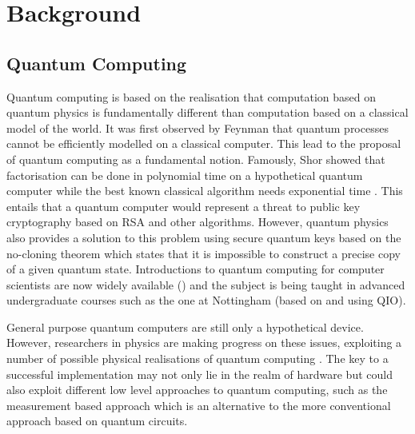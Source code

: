 \documentclass[a4paper]{article}
\begin{document}
\section{Background}

\subsection*{Quantum Computing}
Quantum computing is based on the realisation that computation based
on quantum physics is fundamentally different than computation based
on a classical model of the world. It was first observed by Feynman 
that quantum processes cannot be efficiently modelled on a classical
computer. This lead to the proposal of quantum computing as a
fundamental notion. Famously, Shor showed that factorisation can be
done in polynomial time on a hypothetical quantum computer
 while the
best known classical algorithm needs exponential time
. This entails
that a quantum computer would represent a threat to public key
cryptography based on RSA  and other algorithms. However, quantum
physics also provides a solution to this problem using secure quantum
keys based on the no-cloning theorem which states that it is
impossible to construct a precise copy of a given quantum
state. Introductions to quantum computing for computer scientists are
now widely available () and the
subject is being taught in advanced undergraduate courses
such as the one at Nottingham (based on  and using QIO). 

General purpose quantum computers are still only a hypothetical
device. However, researchers in physics are making progress on these
issues, exploiting a number of possible physical realisations of quantum
computing . The key to a successful
implementation may not only lie in the realm of hardware but could
also exploit different low level approaches to quantum computing, such
as the measurement based approach  
which is an alternative to the more
conventional approach based on quantum circuits.
\end{document}
